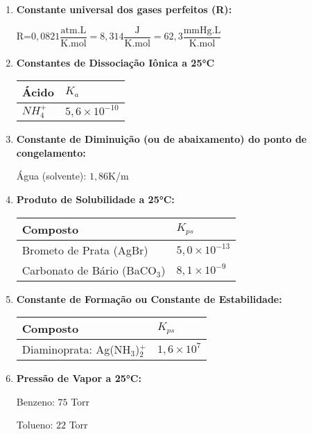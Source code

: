 \documentclass[12pt,a4paper]{article}
\begin{document}
\begin{enumerate}[label=\Roman*.]
\item \textbf{Constante universal dos gases perfeitos (R):} 
 
\vspace{0.2cm}
R=$0,0821 \dfrac{\textrm{atm.L}}{\textrm{K.mol}}=8,314 \dfrac{\textrm{J}}{\textrm{K.mol}}=62,3 \dfrac{\textrm{mmHg.L}}{\textrm{K.mol}}$
\vspace{0.3cm} 

\item \textbf{Constantes de Dissociação Iônica a 25°C} 
\begin{center}
\begin{tabular}{|l|l|}
\hline 
Ácido & $K_a$ \\ \hline
$NH_4^+$ & $5,6\times 10^{-10}$ \\ \hline
\end{tabular}
\end{center}

\item \textbf{Constante de Diminuição (ou de abaixamento) do ponto de congelamento:}

Água (solvente): $1,86$K/m

\item \textbf{Produto de Solubilidade a 25°C:}

\begin{center}
\begin{tabular}{|l|l|}
\hline 
Composto & $K_{ps}$ \\ \hline
Brometo de Prata (AgBr) & $5,0\times 10^{-13}$ \\ \hline
Carbonato de Bário (BaCO$_3$) & $8,1\times 10^{-9}$ \\ \hline
\end{tabular}
\end{center}


\item \textbf{Constante de Formação ou Constante de Estabilidade:}

\begin{center}
\begin{tabular}{|l|l|}
\hline 
Composto & $K_{ps}$ \\ \hline
Diaminoprata: Ag(NH$_3$)$_2^+$ & $1,6\times 10^{7}$ \\ \hline
\end{tabular}
\end{center}


\item \textbf{Pressão de Vapor a 25°C:}

Benzeno: $75$ Torr

Tolueno: $22$ Torr
\end{enumerate}
\end{document}

